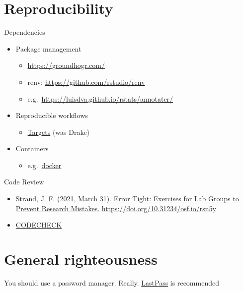 \documentclass[
]{book}
\providecommand{\tightlist}{%
  \setlength{\itemsep}{0pt}\setlength{\parskip}{0pt}}
\begin{document}
\hypertarget{reproducibility}{%
\section{Reproducibility}\label{reproducibility}}

Dependencies

\begin{itemize}
\tightlist
\item
  Package management

  \begin{itemize}
  \tightlist
  \item
    \url{https://groundhogr.com/}
  \item
    renv: \url{https://github.com/rstudio/renv}
  \item
    e.g.~\url{https://luisdva.github.io/rstats/annotater/}
  \end{itemize}
\item
  Reproducible workflows

  \begin{itemize}
  \tightlist
  \item
    \href{https://books.ropensci.org/targets/}{Targets} (was Drake)
  \end{itemize}
\item
  Containers

  \begin{itemize}
  \tightlist
  \item
    e.g.~\href{https://www.docker.com/}{docker}
  \end{itemize}
\end{itemize}

Code Review

\begin{itemize}
\tightlist
\item
  Strand, J. F. (2021, March 31). \href{https://psyarxiv.com/rsn5y}{Error Tight: Exercises for Lab Groups to Prevent Research Mistakes.} \url{https://doi.org/10.31234/osf.io/rsn5y}
\item
  \href{https://codecheck.org.uk/}{CODECHECK}
\end{itemize}

\hypertarget{general-righteousness}{%
\section{General righteousness}\label{general-righteousness}}

You should use a password manager. Really. \href{https://www.lastpass.com}{LastPass} is recommended
\end{document}
